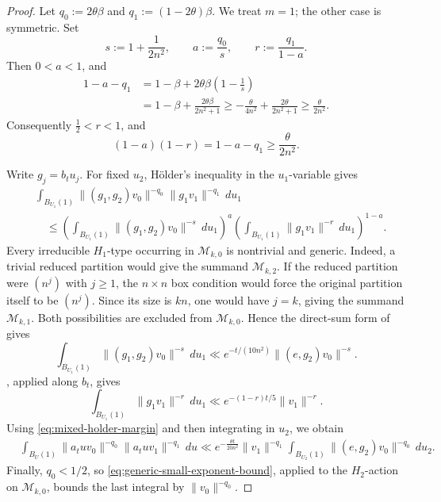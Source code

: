 \documentclass[reqno,11pt]{amsart}
\numberwithin{equation}{section}
\theoremstyle{definition}
\theoremstyle{remark}
\begin{document}
\begin{proof} Let
$q_0:=2\theta\beta$ and $q_1:=(1-2\theta)\beta$.
We treat $m=1$; the other case is symmetric. Set
$$
s:=1+\frac1{2n^2},
\qquad
a:=\frac{q_0}{s},
\qquad
r:=\frac{q_1}{1-a}.
$$
Then $0<a<1$, and
$$
\begin{aligned}
1-a-q_1
&=1-\beta+2\theta\beta\left(1-\frac1s\right)\\
&=1-\beta+\frac{2\theta\beta}{2n^2+1}\ge -\frac{\theta}{4n^2}+\frac{2\theta}{2n^2+1}\ge \frac{\theta}{2n^2}.
\end{aligned}
$$
Consequently $\frac12<r<1$, and
\begin{equation}
\label{eq:mixed-holder-margin}
(1-a)(1-r)=1-a-q_1
\ge \frac{\theta}{2n^2}.
\end{equation}

Write $g_j=b_tu_j$. For fixed $u_2$, H\"older's inequality
in the $u_1$-variable gives
$$
\begin{aligned}
&\int_{B_{U_1}(1)}
 \|(g_1,g_2)v_0\|^{-q_0}\|g_1v_1\|^{-q_1}\,du_1\\
&\quad\le
\left(\int_{B_{U_1}(1)}\|(g_1,g_2)v_0\|^{-s}\,du_1\right)^a
\left(\int_{B_{U_1}(1)}\|g_1v_1\|^{-r}\,du_1\right)^{1-a}.
\end{aligned}
$$
Every irreducible $H_1$-type occurring in $\mathcal M_{k,0}$ is
nontrivial and generic. Indeed, a trivial reduced partition would give the
summand $\mathcal M_{k,2}$. If the reduced partition were $(n^j)$
with $j\ge1$, the $n\times n$ box condition would force the original
partition itself to be $(n^j)$. Since its size is $kn$, one would have
$j=k$, giving the summand $\mathcal M_{k,1}$. Both possibilities are
excluded from $\mathcal M_{k,0}$. Hence the direct-sum form of
 gives
$$
\int_{B_{U_1}(1)}\|(g_1,g_2)v_0\|^{-s}\,du_1
\ll e^{-t/(10n^2)}\|(e,g_2)v_0\|^{-s}.
$$
, applied along $b_t$, gives
$$
\int_{B_{U_1}(1)}\|g_1v_1\|^{-r}\,du_1
\ll e^{-(1-r)t/5}\|v_1\|^{-r}.
$$
Using \eqref{eq:mixed-holder-margin} and then integrating in $u_2$, we
obtain
$$
\begin{aligned}
&\int_{B_{U}(1)}
 \|a_tuv_0\|^{-q_0}\|a_tuv_1\|^{-q_1}\,du \ll e^{-\frac{\theta t}{20n^2} }\|v_1\|^{-q_1}
\int_{B_{U_2}(1)}\|(e,g_2)v_0\|^{-q_0}\,du_2.
\end{aligned}
$$
Finally, $q_0<1/2$, so
\eqref{eq:generic-small-exponent-bound}, applied to the $H_2$-action on
$\mathcal M_{k,0}$, bounds the last integral by
$\|v_0\|^{-q_0}$.
\end{proof}
\end{document}
